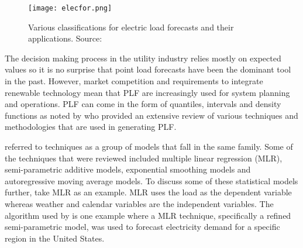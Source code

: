 \begin{figure}
\centering
\texttt{[image: elecfor.png]}
\caption{Various classifications for electric load forecasts and their applications. Source: \citet{hong16}}%
\label{fig:elecfor} 
\end{figure}

The decision making process in the utility industry relies mostly on expected values so it is no surprise that point load forecasts have been the dominant tool in the past. However, market competition and requirements to integrate renewable technology mean that PLF are increasingly used for system planning and operations. PLF can come in the form of quantiles, intervals and density functions as noted by \citet{hong16} who provided an extensive review of various techniques and methodologies that are used in generating PLF. 

\citet{hong16} referred to techniques as a group of models that fall in the same family. Some of the techniques that were reviewed included multiple linear regression (MLR), semi-parametric additive models, exponential smoothing models and autoregressive moving average models. To discuss some of these statistical models further, take MLR as an example. MLR uses the load as the dependent variable whereas weather and calendar variables are the independent variables. The algorithm used by \citet{char14} is one example where a MLR technique, specifically a refined semi-parametric model, was used to forecast electricity demand for a specific region in the United States. %

